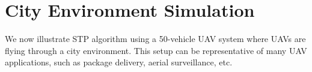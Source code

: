 \section{City Environment Simulation \label{sec:city_sim}}
We now illustrate STP algorithm using a 50-vehicle UAV system where UAVs are flying through a city environment. This setup can be representative of many UAV applications, such as package delivery, aerial surveillance, etc. 